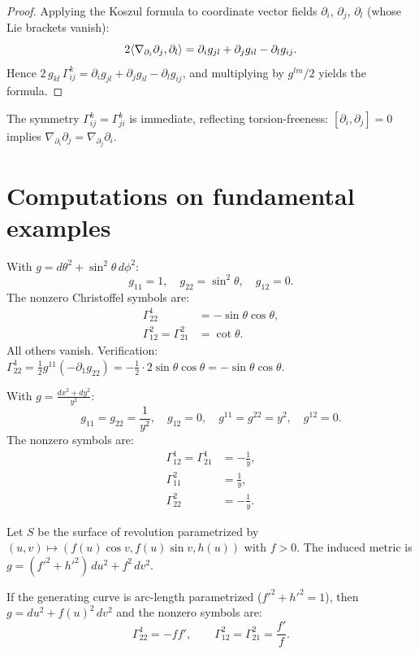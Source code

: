 \begin{proof}
Applying the Koszul formula to coordinate vector fields $\partial_i$, $\partial_j$,
$\partial_l$ (whose Lie brackets vanish):
\[
    2\langle \nabla_{\partial_i}\partial_j, \partial_l \rangle
    = \partial_i g_{jl} + \partial_j g_{il} - \partial_l g_{ij}.
\]
Hence $2\, g_{kl}\, \Gamma^k_{ij} = \partial_i g_{jl} + \partial_j g_{il} - \partial_l g_{ij}$,
and multiplying by $g^{lm}/2$ yields the formula.
\end{proof}

\begin{remark}
The symmetry $\Gamma^k_{ij} = \Gamma^k_{ji}$ is immediate, reflecting
torsion-freeness: $[\partial_i, \partial_j] = 0$ implies
$\nabla_{\partial_i}\partial_j = \nabla_{\partial_j}\partial_i$.
\end{remark}

\section{Computations on fundamental examples}

\begin{example}
With $g = d\theta^2 + \sin^2\!\theta\, d\phi^2$:
\[
    g_{11} = 1, \quad g_{22} = \sin^2\!\theta, \quad g_{12} = 0.
\]
The nonzero Christoffel symbols are:
\begin{align*}
    \Gamma^1_{22} &= -\sin\theta\cos\theta, \\
    \Gamma^2_{12} = \Gamma^2_{21} &= \cot\theta.
\end{align*}
All others vanish. Verification:
$\Gamma^1_{22} = \frac{1}{2}g^{11}(-\partial_1 g_{22}) = -\frac{1}{2}\cdot 2\sin\theta\cos\theta
= -\sin\theta\cos\theta$.
\end{example}

\begin{example}
With $g = \frac{dx^2 + dy^2}{y^2}$:
\[
    g_{11} = g_{22} = \frac{1}{y^2}, \quad g_{12} = 0,
    \quad g^{11} = g^{22} = y^2, \quad g^{12} = 0.
\]
The nonzero symbols are:
\begin{align*}
    \Gamma^1_{12} = \Gamma^1_{21} &= -\frac{1}{y}, \\
    \Gamma^2_{11} &= \frac{1}{y}, \\
    \Gamma^2_{22} &= -\frac{1}{y}.
\end{align*}
\end{example}

\begin{example}
Let $S$ be the surface of revolution parametrized by
$(u, v) \mapsto (f(u)\cos v, f(u)\sin v, h(u))$ with $f > 0$.
The induced metric is $g = (f'^2 + h'^2)\, du^2 + f^2\, dv^2$.

If the generating curve is arc-length parametrized ($f'^2 + h'^2 = 1$),
then $g = du^2 + f(u)^2\, dv^2$ and the nonzero symbols are:
\[
    \Gamma^1_{22} = -f f', \qquad
    \Gamma^2_{12} = \Gamma^2_{21} = \frac{f'}{f}.
\]
\end{example}

